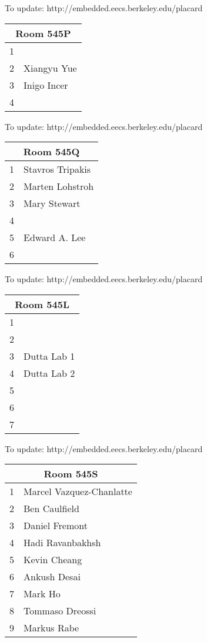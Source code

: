\documentclass{article}
\begin{document}
{\scriptsize To update: http://embedded.eecs.berkeley.edu/placard}
\vspace{1in}

\noindent
\begin{tabular}{|l|l|}
\hline
\multicolumn{2}{|c|}{Room 545P} \\ \hline\hline
1& \\
2&Xiangyu Yue\\
3&Inigo Incer\\
4& \\

\hline
\end{tabular}

{\scriptsize To update: http://embedded.eecs.berkeley.edu/placard}
\vspace{1in}

\noindent
\begin{tabular}{|l|l|}
\hline
\multicolumn{2}{|c|}{Room 545Q} \\ \hline\hline
1&Stavros Tripakis\\
2&Marten Lohstroh\\
3&Mary Stewart\\
4& \\
5&Edward A. Lee\\
6& \\

\hline
\end{tabular}

{\scriptsize To update: http://embedded.eecs.berkeley.edu/placard}
\vspace{1in}

\noindent
\begin{tabular}{|l|l|}
\hline
\multicolumn{2}{|c|}{Room 545L} \\ \hline\hline
1& \\
2& \\
3&Dutta Lab 1\\
4&Dutta Lab 2\\
5& \\
6& \\
7& \\

\hline
\end{tabular}

{\scriptsize To update: http://embedded.eecs.berkeley.edu/placard}
\vspace{1in}

\noindent
\begin{tabular}{|l|l|}
\hline
\multicolumn{2}{|c|}{Room 545S} \\ \hline\hline
1&Marcel  Vazquez-Chanlatte\\
2&Ben  Caulfield\\
3&Daniel Fremont\\
4&Hadi Ravanbakhsh\\
5&Kevin Cheang\\
6&Ankush Desai\\
7&Mark Ho\\
8&Tommaso Dreossi\\
9&Markus Rabe\\

\hline
\end{tabular}
\end{document}
